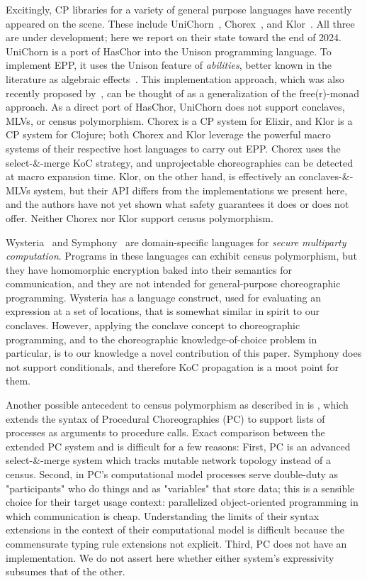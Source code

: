 Excitingly, CP libraries for a variety of general purpose languages have recently appeared on the scene.
These include UniChorn~\cite{unichorn}, Chorex~\cite{chorex-github}, and Klor~\cite{klor-github}.
All three are under development; here we report on their state toward the end of 2024.
UniChorn is a port of HasChor into the Unison programming language.
To implement EPP, it uses the Unison feature of \emph{abilities}, better known in the literature as algebraic effects~\cite{plotkin-2003,plotkin-2013}.
This implementation approach, which was also recently proposed by~\cite{shen-alg-eff-cp},
can be thought of as a generalization of the free(r)-monad approach.
As a direct port of HasChor, UniChorn does not support conclaves, MLVs, or census polymorphism.
Chorex is a CP system for Elixir, and Klor is a CP system for Clojure;
both Chorex and Klor leverage the powerful macro systems of their respective host languages to carry out EPP.
Chorex uses the select-\&-merge KoC strategy, and unprojectable choreographies can be detected at macro expansion time.
Klor, on the other hand, is effectively an conclaves-\&-MLVs system, but their API differs from the implementations we present here,
and the authors have not yet shown what safety guarantees it does or does not offer.
Neither Chorex nor Klor support census polymorphism.

Wysteria~\cite{wysteria} and Symphony~\cite{Sweet_2023} are domain-specific languages for \emph{secure multiparty computation}.
Programs in these languages can exhibit census polymorphism,
but they have homomorphic encryption baked into their
semantics for communication,
and they are not intended for general-purpose choreographic programming.
Wysteria has a  language construct, used for evaluating an expression at a set of locations,
that is somewhat similar in spirit to our conclaves.
However, applying the conclave concept to choreographic programming, and to the choreographic knowledge-of-choice problem in particular,
is to our knowledge a novel contribution of this paper.
Symphony does not support conditionals, and therefore KoC propagation is a moot point for them.

Another possible antecedent to census polymorphism as described in  is \cite{cp_practice_cruz_filipe_montesi},
which extends the syntax of Procedural Choreographies (PC) \cite{cp_procedural_cruz_filipe_montesi}
to support lists of processes as arguments to procedure calls.
Exact comparison between the extended PC system and \MultiChor is difficult for a few reasons:
First, PC is an advanced select-\&-merge system which tracks mutable network topology instead of a census.
Second, in PC's computational model processes serve double-duty as "participants" who do things and as "variables" that store data;
this is a sensible choice for their target usage context: parallelized object-oriented programming in which communication is cheap.
Understanding the limits of their syntax extensions in the context of their computational model is difficult because
the commensurate typing rule extensions not explicit.
Third, PC does not have an implementation.
We do not assert here whether either system's expressivity subsumes that of the other.





